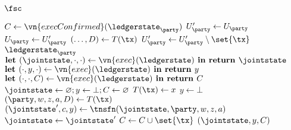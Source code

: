 \begin{functionality}{$\fsc$}
  \begin{helpers}
      \State \Let $C \gets \vn{execConfirmed}(\ledgerstate_\party)$
      \State \Let $U_\party' \gets U_\party$
      \Repeat
        \State \Let $U_\party \gets U_\party'$
          \State \Let $(\ldots, D) \gets T(\tx)$
            \State \Let $U_\party' \gets U_\party' \setminus \set{\tx}$
          \EndIf
        \EndFor
      \State \Return $\ledgerstate_\party$
    \EndProcedure
      \State $\textbf{let }(\jointstate, \cdot, \cdot) \gets \vn{exec}(\ledgerstate)
      \textbf{ in return } \jointstate$
    \EndProcedure
      \State $\textbf{let }(\cdot, y, \cdot) \gets \vn{exec}(\ledgerstate)
      \textbf{ in return } y$
    \EndProcedure
      \State $\textbf{let }(\cdot, \cdot, C) \gets \vn{exec}(\ledgerstate)
      \textbf{ in return } C$
    \EndProcedure
      \State \Let $\jointstate \gets \varnothing; y \gets \bot; C \gets \varnothing$
            \State \Let $T(\tx) \gets x$
          \EndIf
        \EndIf
        \State $y \gets \bot$
          \Continue
        \EndIf
        \State \Let $(\party, w, z, a, D) \gets T(\tx)$
          \Continue
        \EndIf
        \State \Let $(\jointstate', c, y) \gets \tnsfn(\jointstate, \party, w, z, a)$
          \Let $\jointstate \gets \jointstate'$
        \EndIf
          \Let $C \gets C \cup \set{\tx}$
        \EndIf
      \EndFor
      \State \Return $(\jointstate, y, C)$
    \EndProcedure
  \end{helpers}
\end{functionality}

